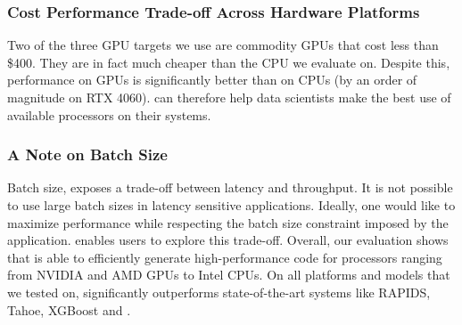 \subsubsection*{Cost Performance Trade-off Across Hardware Platforms}
Two of the three GPU targets we use are commodity GPUs that cost less than \$400. They 
are in fact much cheaper than the CPU we evaluate on. Despite this, performance on GPUs
is significantly better than on CPUs (by an order of magnitude on RTX 4060).
\Treebeard{} can therefore help data scientists make the best use of 
available processors on their systems.

\subsubsection*{A Note on Batch Size}
Batch size, exposes a trade-off between latency and throughput. It is not possible to use 
large batch sizes in latency sensitive applications. 
Ideally, one would like 
to maximize performance while respecting the batch size constraint imposed 
by the application. \Treebeard{} enables users to explore this trade-off.  
\bigbreak
\noindent
Overall, our evaluation shows that \Treebeard{} is able to efficiently generate 
high-performance code for processors ranging from NVIDIA and AMD GPUs to Intel CPUs.
On all platforms and models that we tested on, \Treebeard{} significantly outperforms
state-of-the-art systems like RAPIDS, Tahoe, XGBoost and \TreebeardOLD{}.
